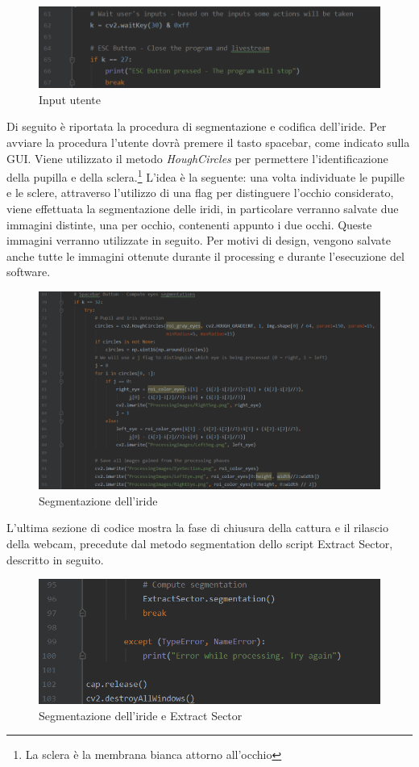 \begin{figure}[h!]
	\centering
	\includegraphics[width=120mm]{img/5/codice_1_6}
	\caption{\fontsize{10px}{0mm}\selectfont Input utente \label{fig:codice_1_6}}
\end{figure}
\newpage
Di seguito è riportata la procedura di segmentazione e codifica dell'iride. Per avviare la procedura l'utente dovrà premere il tasto spacebar, come indicato sulla \ac{GUI}.
Viene utilizzato il metodo \emph{HoughCircles} per permettere l'identificazione della pupilla e della sclera.\footnote{La sclera è la membrana bianca attorno all'occhio}
L'idea è la seguente: una volta individuate le pupille e le sclere, attraverso l'utilizzo di una flag per distinguere l'occhio considerato, viene effettuata la segmentazione delle iridi, in particolare verranno salvate due immagini distinte, una per occhio, contenenti appunto i due occhi. Queste immagini verranno utilizzate in seguito.
Per motivi di design, vengono salvate anche tutte le immagini ottenute durante il processing e durante l'esecuzione del software.
\begin{figure}[h!]
	\centering
	\includegraphics[width=120mm]{img/5/codice_1_7}
	\caption{\fontsize{10px}{0mm}\selectfont Segmentazione dell'iride \label{fig:codice_1_7}}
\end{figure}
L'ultima sezione di codice mostra la fase di chiusura della cattura e il rilascio della webcam, precedute dal metodo segmentation dello script Extract Sector, descritto in seguito. 
\begin{figure}[h!]
	\centering
	\includegraphics[width=120mm]{img/5/codice_1_8}
	\caption{\fontsize{10px}{0mm}\selectfont Segmentazione dell'iride e Extract Sector \label{fig:codice_1_8}}
\end{figure}\newpage


